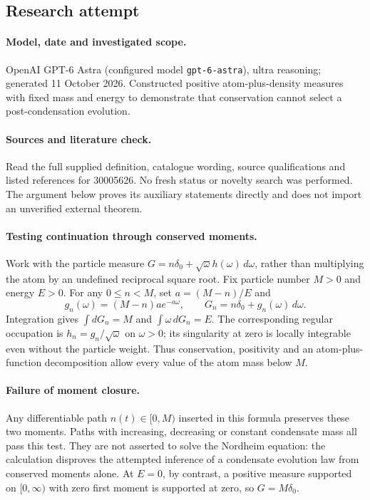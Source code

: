 \documentclass[11pt]{article}
\begin{document}
\subsection{Research attempt}
\paragraph{Model, date and investigated scope.}
OpenAI GPT-6 Astra (configured model \texttt{gpt-6-astra}), ultra reasoning; generated 11 October 2026. Constructed positive atom-plus-density measures with fixed mass and energy to demonstrate that conservation cannot select a post-condensation evolution.

\paragraph{Sources and literature check.}
Read the full supplied definition, catalogue wording, source qualifications and listed references for 30005626. No fresh status or novelty search was performed. The argument below proves its auxiliary statements directly and does not import an unverified external theorem.

\paragraph{Testing continuation through conserved moments.} Work with the particle measure \(G=n\delta_0+\sqrt\omega h(\omega)\,d\omega\), rather than multiplying the atom by an undefined reciprocal square root. Fix particle number \(M>0\) and energy \(E>0\). For any \(0\leq n<M\), set \(a=(M-n)/E\) and
\[
 g_n(\omega)=(M-n)a e^{-a\omega},\qquad
 G_n=n\delta_0+g_n(\omega)\,d\omega.
\]
Integration gives \(\int dG_n=M\) and \(\int\omega\,dG_n=E\). The corresponding regular occupation is \(h_n=g_n/\sqrt\omega\) on \(\omega>0\); its singularity at zero is locally integrable even without the particle weight. Thus conservation, positivity and an atom-plus-function decomposition allow every value of the atom mass below \(M\).
\paragraph{Failure of moment closure.} Any differentiable path \(n(t)\in[0,M)\) inserted in this formula preserves these two moments. Paths with increasing, decreasing or constant condensate mass all pass this test. They are not asserted to solve the Nordheim equation: the calculation disproves the attempted inference of a condensate evolution law from conserved moments alone. At \(E=0\), by contrast, a positive measure supported on \([0,\infty)\) with zero first moment is supported at zero, so \(G=M\delta_0\).
\end{document}
